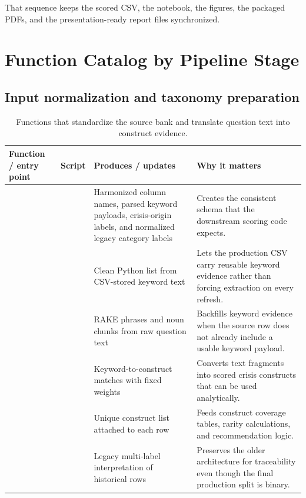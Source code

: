 \documentclass[12pt]{article}
\begin{document}
That sequence keeps the scored CSV, the notebook, the figures, the packaged PDFs, and the presentation-ready report files synchronized.

\clearpage
\appendix

\section{Function Catalog by Pipeline Stage}

\subsection{Input normalization and taxonomy preparation}

\begin{table}[H]
\centering
\footnotesize
\begin{tabularx}{\textwidth}{L{0.25\textwidth} L{0.19\textwidth} L{0.21\textwidth} Y}
\toprule
Function / entry point & Script & Produces / updates & Why it matters \\
\midrule
{} &  & Harmonized column names, parsed keyword payloads, crisis-origin labels, and normalized legacy category labels & Creates the consistent schema that the downstream scoring code expects. \\
 &  & Clean Python list from CSV-stored keyword text & Lets the production CSV carry reusable keyword evidence rather than forcing extraction on every refresh. \\
 &  & RAKE phrases and noun chunks from raw question text & Backfills keyword evidence when the source row does not already include a usable keyword payload. \\
 &  & Keyword-to-construct matches with fixed weights & Converts text fragments into scored crisis constructs that can be used analytically. \\
 &  & Unique construct list attached to each row & Feeds construct coverage tables, rarity calculations, and recommendation logic. \\
 &  & Legacy multi-label interpretation of historical rows & Preserves the older architecture for traceability even though the final production split is binary. \\
\bottomrule
\end{tabularx}
\caption{Functions that standardize the source bank and translate question text into construct evidence.}
\end{table}
\end{document}
